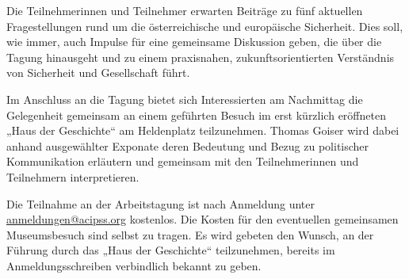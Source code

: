\documentclass[a4paper,10pt]{article}
\begin{document}
\begin{minipage}[t]{0.63\textwidth}
\small
Die Teilnehmerinnen und Teilnehmer erwarten Beiträge zu fünf aktuellen Fragestellungen rund um die österreichische und europäische Sicherheit. Dies soll, wie immer, auch Impulse für eine gemeinsame Diskussion geben, die über die Tagung hinausgeht und zu einem praxisnahen, zukunftsorientierten Verständnis von Sicherheit und Gesellschaft führt. 
\medskip

Im Anschluss an die Tagung bietet sich Interessierten am Nachmittag die Gelegenheit gemeinsam an einem geführten Besuch im erst kürzlich eröffneten „Haus der Geschichte“ am Heldenplatz teilzunehmen. Thomas Goiser wird dabei anhand ausgewählter Exponate deren Bedeutung und Bezug zu politischer Kommunikation erläutern und gemeinsam mit den Teilnehmerinnen und Teilnehmern interpretieren.
\medskip

Die Teilnahme an der Arbeitstagung ist nach Anmeldung unter \protect\url{anmeldungen@acipss.org} kostenlos. 
Die Kosten für den eventuellen gemeinsamen Museumsbesuch sind selbst zu tragen. 
Es wird gebeten den Wunsch, an der Führung durch das „Haus der Geschichte“ teilzunehmen, bereits im Anmeldungsschreiben verbindlich bekannt zu geben.   
\end{minipage}\hfill\hspace{2em}
\end{document}
